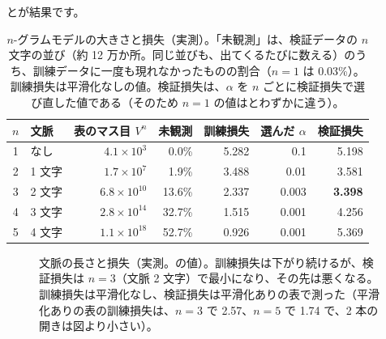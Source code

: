 とが結果です。

\begin{table}[tbp]
\centering
\caption{$n$-グラムモデルの大きさと損失（実測）。「未観測」は、検証データの $n$ 文字の並び（約 12 万か所。同じ並びも、出てくるたびに数える）のうち、訓練データに一度も現れなかったものの割合（$n=1$ は 0.03\%）。
訓練損失は平滑化なしの値。検証損失は、$\alpha$ を $n$ ごとに検証損失で選び直した値である（そのため $n=1$ の値はとわずかに違う）。}
\label{tab:lm-ngram}
\small
\begin{tabular}{clrrrrr}
\toprule
$n$ & 文脈 & 表のマス目 $V^{n}$ & 未観測 & 訓練損失 & 選んだ $\alpha$ & 検証損失 \\
\midrule
1 & なし & $4.1\times10^{3}$ & 0.0\% & 5.282 & 0.1 & 5.198 \\
2 & 1 文字 & $1.7\times10^{7}$ & 1.9\% & 3.488 & 0.01 & 3.581 \\
3 & 2 文字 & $6.8\times10^{10}$ & 13.6\% & 2.337 & 0.003 & \textbf{3.398} \\
4 & 3 文字 & $2.8\times10^{14}$ & 32.7\% & 1.515 & 0.001 & 4.256 \\
5 & 4 文字 & $1.1\times10^{18}$ & 52.7\% & 0.926 & 0.001 & 5.369 \\
\bottomrule
\end{tabular}
\end{table}

\begin{figure}[tbp]
\centering
{}
\caption{文脈の長さと損失（実測。の値）。訓練損失は下がり続けるが、検証損失は $n=3$（文脈 2 文字）で最小になり、その先は悪くなる。訓練損失は平滑化なし、検証損失は平滑化ありの表で測った（平滑化ありの表の訓練損失は、$n=3$ で 2.57、$n=5$ で 1.74 で、2 本の開きは図より小さい）。}
\label{fig:lm-ngram}
\end{figure}

